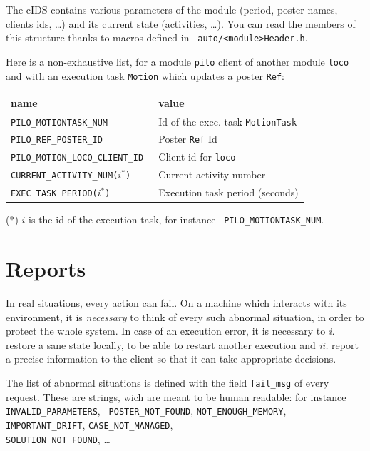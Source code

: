 The cIDS contains various parameters of the module (period, poster names,
clients ids, \ldots) and its current  state (activities, \ldots). You can
read  the members  of this  structure thanks   to macros  defined in {\tt
auto/<module>Header.h}.

Here is a non-exhaustive list, for a module {\tt  pilo} client of another
module {\tt loco} and with an execution task {\tt Motion} which updates a
poster {\tt Ref}:

\bigbreak

{\small\begin{tabularx}{0.8\linewidth}{|l|X|}
\hline
name & value\\
\hline
\tt PILO\_MOTIONTASK\_NUM    & Id of the exec. task {\tt MotionTask}\\
\tt PILO\_REF\_POSTER\_ID    & Poster {\tt Ref} Id\\
\tt PILO\_MOTION\_LOCO\_CLIENT\_ID & Client id for {\tt loco}\\
\tt CURRENT\_ACTIVITY\_NUM($i^*$) & Current activity number\\
\tt EXEC\_TASK\_PERIOD($i^*$) & Execution task period (seconds)\\
\hline
\end{tabularx}}

($*$)  $i$ is   the  id  of  the    execution  task, for   instance  {\tt
PILO\_MOTIONTASK\_NUM}.


\section{Reports}

In real situations, every action can fail. On a machine which
interacts with  its environment, it is {\em  necessary} to think of every
such abnormal situation, in order to protect the whole system. In case of
an execution error,  it  is necessary to {\em   i.} restore a sane  state
locally, to be able to restart another  execution and {\em ii.}  report a
precise information   to the  client so  that   it can   take appropriate
decisions.

The list of abnormal situations is defined with the field {\tt fail\_msg}
of every   request.  These   are strings,   wich are   meant to be  human
readable:       for      instance  {\tt      INVALID\_PARAMETERS},   {\tt
POSTER\_NOT\_FOUND}, {\tt NOT\_ENOUGH\_MEMORY},   {\tt IMPORTANT\_DRIFT},
{\tt CASE\_NOT\_MANAGED},\\ {\tt SOLUTION\_NOT\_FOUND}, \ldots

